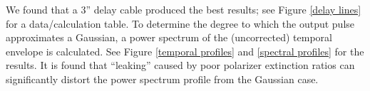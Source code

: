 We found that a 3'' delay cable produced the best results; see Figure \ref{delay lines} for a data/calculation table. To determine the degree to which the output pulse approximates a Gaussian, a power spectrum of the (uncorrected) temporal envelope is calculated. See Figure \ref{temporal profiles} and \ref{spectral profiles} for the results. It is found that ``leaking'' caused by poor polarizer extinction ratios can significantly distort the power spectrum profile from the Gaussian case.
